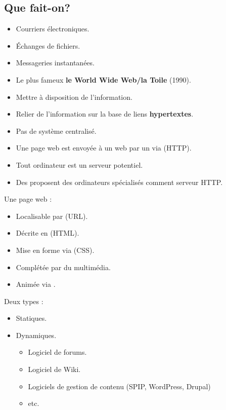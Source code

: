 \subsection{Que fait-on?}

\begin{frame}
	\begin{itemize}
		\item Courriers électroniques.
		\item Échanges de fichiers.
		\item Messageries instantanées.
		\item Le plus fameux \textbf{le World Wide Web/la Toile} (1990).
	\end{itemize}
\end{frame}


\begin{frame}
	\begin{itemize}
		\item Mettre à disposition de l'information.
		\item Relier de l'information sur la base de liens \textbf{hypertextes}.
		\item Pas de système centralisé.
	\end{itemize}
\end{frame}

\begin{frame}
	\begin{itemize}
		\item Une page web est envoyée à un  web par un  via  (HTTP).
		\item Tout ordinateur est un serveur potentiel.
		\item Des  proposent des  ordinateurs spécialisés comment serveur HTTP.
	\end{itemize}
\end{frame}

\begin{frame}
	Une page web :
	\begin{itemize}
		\item Localisable par  (URL).
		\item Décrite en  (HTML).
		\item Mise en forme via  (CSS).
		\item Complétée par du multimédia.
		\item Animée via .
	\end{itemize}

\end{frame}

\begin{frame}
	Deux types :
	\begin{itemize}
		\item Statiques.
		\item Dynamiques.
		\begin{itemize}
			\item Logiciel de forums.
			\item Logiciel de Wiki.
			\item Logiciels de gestion de contenu (SPIP, WordPress, Drupal)
			\item etc.
		\end{itemize} 
	\end{itemize}
\end{frame}

